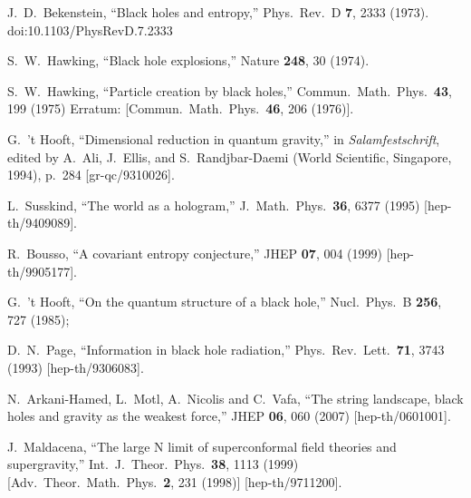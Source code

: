 \documentclass[12pt]{article}
\begin{document}
\begin{thebibliography}{99}

J.~D.~Bekenstein,
``Black holes and entropy,''
Phys.\ Rev.\ D {\bf 7}, 2333 (1973).
doi:10.1103/PhysRevD.7.2333

S.~W.~Hawking,
``Black hole explosions,''
Nature {\bf 248}, 30 (1974).

S.~W.~Hawking,
``Particle creation by black holes,''
Commun.\ Math.\ Phys.\ {\bf 43}, 199 (1975)
Erratum: [Commun.\ Math.\ Phys.\  {\bf 46}, 206 (1976)].

G.~'t Hooft,
``Dimensional reduction in quantum gravity,''
in {\it Salamfestschrift},
edited by A.~Ali, J.~Ellis, and S.~Randjbar-Daemi
(World Scientific, Singapore, 1994), p.~284
[gr-qc/9310026].

L.~Susskind,
``The world as a hologram,''
J.\ Math.\ Phys.\ {\bf 36}, 6377 (1995)
[hep-th/9409089].

R.~Bousso,
``A covariant entropy conjecture,''
JHEP {\bf 07}, 004 (1999)
[hep-th/9905177].

G.~'t Hooft,
``On the quantum structure of a black hole,''
Nucl.\ Phys.\ B {\bf 256}, 727 (1985);

D.~N.~Page,
``Information in black hole radiation,''
Phys.\ Rev.\ Lett.\ {\bf 71}, 3743 (1993)
[hep-th/9306083].

N.~Arkani-Hamed, L.~Motl, A.~Nicolis and C.~Vafa,
``The string landscape, black holes and gravity as the weakest force,''
JHEP {\bf 06}, 060 (2007)
[hep-th/0601001].

J.~Maldacena,
``The large N limit of superconformal field theories and supergravity,''
Int.\ J.\ Theor.\ Phys.\  {\bf 38}, 1113 (1999)
[Adv.\ Theor.\ Math.\ Phys.\  {\bf 2}, 231 (1998)]
[hep-th/9711200].


\end{thebibliography}
\end{document}
